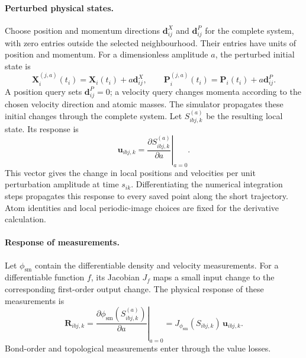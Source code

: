 \documentclass[11pt,a4paper]{article}
\newcommand{\X}{\mathbf X}
\newcommand{\Pp}{\mathbf P}
\begin{document}
\paragraph{Perturbed physical states.}
Choose position and momentum directions $\mathbf d^X_{ij}$ and
$\mathbf d^P_{ij}$ for the complete system, with zero entries outside the
selected neighbourhood. Their entries have units of position and momentum.
For a dimensionless amplitude $a$, the perturbed initial state is
\[
\X_i^{(j,a)}(t_i)=\X_i(t_i)+a\mathbf d^X_{ij},
\qquad
\Pp_i^{(j,a)}(t_i)=\Pp_i(t_i)+a\mathbf d^P_{ij}.
\]
A position query sets $\mathbf d^P_{ij}=0$; a velocity query changes momenta
according to the chosen velocity direction and atomic masses.
The simulator propagates these initial changes through the complete system.
Let $S_{ibj,k}^{(a)}$ be the resulting local state. Its response is
\[
\mathbf u_{ibj,k}
=\left.\frac{\partial S_{ibj,k}^{(a)}}{\partial a}\right|_{a=0}.
\]
This vector gives the change in local positions and velocities per unit
perturbation amplitude at time $s_{ik}$. Differentiating the numerical
integration steps propagates this response to every saved point along the
short trajectory. Atom identities and local periodic-image choices are fixed
for the derivative calculation.

\paragraph{Response of measurements.}
Let $\phi_{\mathrm{sm}}$ contain the differentiable density and velocity
measurements. For a differentiable function $f$, its Jacobian $J_f$ maps a
small input change to the corresponding first-order output change.
The physical response of these measurements is
\[
\boxed{
\mathbf R_{ibj,k}
=\left.\frac{\partial\phi_{\mathrm{sm}}(S_{ibj,k}^{(a)})}{\partial a}\right|_{a=0}
=J_{\phi_{\mathrm{sm}}}(S_{ibj,k})\,\mathbf u_{ibj,k}.
}
\]
Bond-order and topological measurements enter through the value losses.
\end{document}
